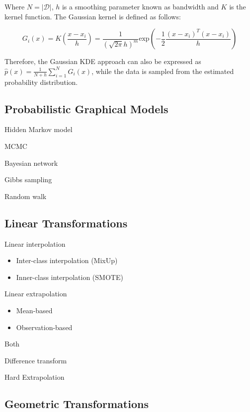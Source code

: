 \documentclass[parskip=full]{scrartcl}
\begin{document}
Where $N = |\mathcal{D}|$, $h$ is a smoothing parameter known as bandwidth and
$K$ is the kernel function. The Gaussian kernel is defined as follows:

\begin{equation}
    G_i(x) = K\left(\frac{x-x_i}{h} \right) = \frac{1}{(\sqrt{2\pi} h)^m} 
    \text{exp}\left(-\frac{1}{2}\frac{(x-x_i)^T(x-x_i)}{h}\right) 
\end{equation}

Therefore, the Gaussian KDE approach can also be expressed as $\hat{p}(x) =
\frac{1}{N+h}\sum_{i=1}^{N}G_i(x)$, while the data is sampled from the
estimated probability distribution. 


\subsection{Probabilistic Graphical Models}

Hidden Markov model

MCMC

Bayesian network

Gibbs sampling

Random walk

\subsection{Linear Transformations}

Linear interpolation

\begin{itemize}
    \item Inter-class interpolation (MixUp)
    \item Inner-class interpolation (SMOTE)
\end{itemize}

Linear extrapolation
\begin{itemize}
    \item Mean-based
    \item Observation-based
\end{itemize}

Both

Difference transform~\cite{cheung2020modals}

Hard Extrapolation

\subsection{Geometric Transformations}
\end{document}
